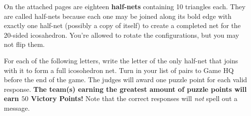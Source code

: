 \begin{extraPuzzle}
On the attached pages are eighteen \textbf{half-nets} containing 10 triangles
each. They are called half-nets because each one may be joined along its
bold edge with exactly one half-net (possibly a copy of itself) to create a
completed net for the 20-sided icosahedron.
You're allowed to rotate the configurations, but you may
not flip them.


For each of the following letters, write the letter of the only half-net
that joins with it to form a full icosohedron net.
Turn in your list of pairs to Game HQ before the end of the game.
The judges will award one puzzle point for each valid response.
\textbf{
The team(s) earning the greatest amount of puzzle points
will earn \(50\) Victory Points!
} Note that the correct responses will \textit{not} spell out a message.

\begin{center}\small
\end{center}
\begin{center}\small
\end{center}
\begin{center}\small
\end{center}

\newpage

\begin{minipage}{\linewidth}\Large
\begin{center}
\def\svgwidth{.9\columnwidth}

\end{center}
\end{minipage}
\newpage

\begin{minipage}{\linewidth}\Large
\begin{center}
\def\svgwidth{.9\columnwidth}

\end{center}
\end{minipage}
\newpage


\end{extraPuzzle}
